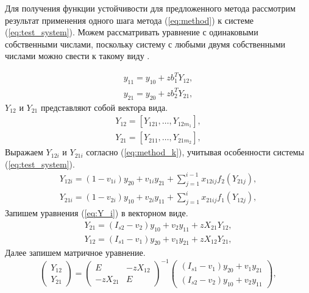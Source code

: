 \documentclass[a4paper,article,14pt]{extarticle}
\begin{document}
Для получения функции устойчивости для предложенного метода рассмотрим результат применения одного шага метода (\ref{eq:method}) к системе (\ref{eq:test_system}). Можем рассматривать уравнение с одинаковыми собственными числами, поскольку систему с любыми двумя собственными числами можно свести к такому виду \cite{stability}.

\begin{equation}
\begin{aligned}
    y_{11} = y_{10} + z b_1^T Y_{12}, \\
    y_{21} = y_{20} + z b_2^T Y_{21},
\end{aligned}    
\label{eq:one_step}
\end{equation}
$Y_{12}$ и $Y_{21}$ представляют собой вектора вида.
\begin{equation}
\begin{aligned}
Y_{12} = \left[
Y_{121}, \dotsc, Y_{12m_{1}}
\right], \\
Y_{21} = \left[
Y_{211}, \dotsc, Y_{21m_{2}}
\right],
\end{aligned}
\end{equation}
Выражаем $Y_{12i}$ и $Y_{21i}$ согласно (\ref{eq:method_k}), учитывая особенности системы (\ref{eq:test_system}).
\begin{equation}
\begin{aligned}
    Y_{12i} = (1 - v_{1i}) y_{20} + v_{1i} y_{21} + \sum_{j=1}^{i-1} x_{12ij} f_{2} (Y_{21j}),\\
    Y_{21i} = (1 - v_{2i}) y_{10} + v_{2i} y_{11} + \sum_{j=1}^{i} x_{21ij} f_{1} (Y_{12j}),
\end{aligned}
\label{eq:Y_i}
\end{equation}
Запишем уравнения (\ref{eq:Y_i}) в векторном виде.
\begin{equation}
\begin{aligned}
    Y_{21} = (I_{s2} - v_{2}) y_{10} + v_{2} y_{11} + z X_{21} Y_{12}, \\
    Y_{12} = (I_{s1} - v_{1}) y_{20} + v_{1} y_{21} + z X_{12} Y_{21},
\end{aligned}
\end{equation}
Далее запишем матричное уравнение.
\begin{equation}
    \begin{pmatrix} Y_{12}\\ Y_{21} \end{pmatrix}
    = \begin{pmatrix}
        E & -z X_{12} \\
        -z X_{21} & E
    \end{pmatrix}^{-1}
    \begin{pmatrix}
        (I_{s1} - v_{1}) y_{20} + v_{1} y_{21} \\
        (I_{s2} - v_{2}) y_{10} + v_{2} y_{11}
    \end{pmatrix},
\label{eq:Y_matrix}
\end{equation}
\end{document}

